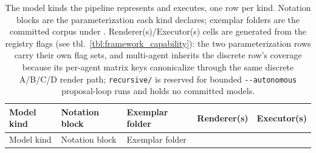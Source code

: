 \documentclass[
  english,
  9pt,
]{extarticle}
\begin{document}
\begin{longtable}[]{@{}
  >{\raggedright\arraybackslash}p{}
  >{\raggedright\arraybackslash}p{}
  >{\raggedright\arraybackslash}p{}
  >{\raggedright\arraybackslash}p{}
  >{\raggedright\arraybackslash}p{}@{}}
\caption{The model kinds the pipeline represents and executes, one row
per kind. Notation blocks are the parameterization each kind declares;
exemplar folders are the committed corpus under
\protect{}. Renderer(s)/Executor(s) cells are
generated from the registry flags (see
tbl.~\ref{tbl:framework_capability}): the two parameterization rows
carry their own flag sets, and multi-agent inherits the discrete row's
coverage because its per-agent matrix keys canonicalize through the same
discrete A/B/C/D render path; \protect\texttt{recursive/} is reserved
for bounded \protect\texttt{-\/-autonomous} proposal-loop runs and holds
no committed models.}\label{tbl:model_kinds}\tabularnewline
\toprule\noalign{}
\begin{minipage}[b]{\linewidth}\raggedright
Model kind
\end{minipage} & \begin{minipage}[b]{\linewidth}\raggedright
Notation block
\end{minipage} & \begin{minipage}[b]{\linewidth}\raggedright
Exemplar folder
\end{minipage} & \begin{minipage}[b]{\linewidth}\raggedright
Renderer(s)
\end{minipage} & \begin{minipage}[b]{\linewidth}\raggedright
Executor(s)
\end{minipage} \\
\midrule\noalign{}
\endfirsthead
\toprule\noalign{}
\begin{minipage}[b]{\linewidth}\raggedright
Model kind
\end{minipage} & \begin{minipage}[b]{\linewidth}\raggedright
Notation block
\end{minipage} & \begin{minipage}[b]{\linewidth}\raggedright
Exemplar folder
\end{minipage} & \begin{minipage}[b]{\linewidth}\raggedright

\end{minipage}
\end{longtable}
\end{document}
